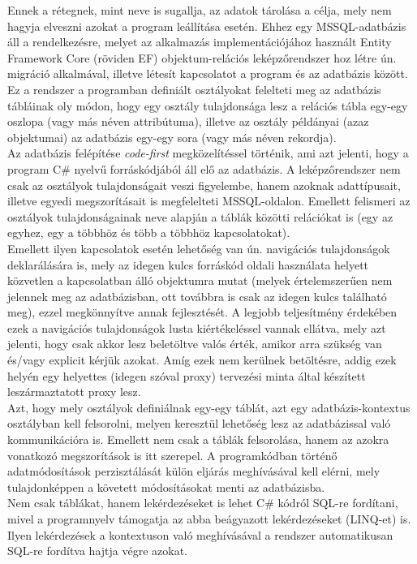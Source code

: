 Ennek a rétegnek, mint neve is sugallja, az adatok tárolása a célja, mely nem hagyja elveszni azokat a program leállítása esetén. Ehhez egy MSSQL-adatbázis áll a rendelkezésre, melyet az alkalmazás implementációjához használt Entity Framework Core (röviden EF) objektum-relációs leképzőrendszer hoz létre ún. migráció alkalmával, illetve létesít kapcsolatot a program és az adatbázis között. Ez a rendszer a programban definiált osztályokat felelteti meg az adatbázis tábláinak oly módon, hogy egy osztály tulajdonsága lesz a relációs tábla egy-egy oszlopa (vagy más néven attribútuma), illetve az osztály példányai (azaz objektumai) az adatbázis egy-egy sora (vagy más néven rekordja).\\
Az adatbázis felépítése \textit{code-first} megközelítéssel történik, ami azt jelenti, hogy a program C\# nyelvű forráskódjából áll elő az adatbázis. A leképzőrendszer nem csak az osztályok tulajdonságait veszi figyelembe, hanem azoknak adattípusait, illetve egyedi megszorításait is megfelelteti MSSQL-oldalon. Emellett felismeri az osztályok tulajdonságainak neve alapján a táblák közötti relációkat is (egy az egyhez, egy a többhöz és több a többhöz kapcsolatokat).\\
Emellett ilyen kapcsolatok esetén lehetőség van ún. navigációs tulajdonságok deklarálására is, mely az idegen kulcs forráskód oldali használata helyett közvetlen a kapcsolatban álló objektumra mutat (melyek értelemszerűen nem jelennek meg az adatbázisban, ott továbbra is csak az idegen kulcs található meg), ezzel megkönnyítve annak fejlesztését. A legjobb teljesítmény érdekében ezek a navigációs tulajdonságok lusta kiértékeléssel vannak ellátva, mely azt jelenti, hogy csak akkor lesz beletöltve valós érték, amikor arra szükség van és/vagy explicit kérjük azokat. Amíg ezek nem kerülnek betöltésre, addig ezek helyén egy helyettes (idegen szóval proxy) tervezési minta által készített leszármaztatott proxy lesz.\\
Azt, hogy mely osztályok definiálnak egy-egy táblát, azt egy adatbázis-kontextus osztályban kell felsorolni, melyen keresztül lehetőség lesz az adatbázissal való kommunikációra is. Emellett nem csak a táblák felsorolása, hanem az azokra vonatkozó megszorítások is itt szerepel. A programkódban történő adatmódosítások perzisztálását külön eljárás meghívásával kell elérni, mely tulajdonképpen a követett módosításokat menti az adatbázisba.\\
Nem csak táblákat, hanem lekérdezéseket is lehet C\# kódról SQL-re fordítani, mivel a programnyelv támogatja az abba beágyazott lekérdezéseket (LINQ-et) is. Ilyen lekérdezések a kontextuson való meghívásával a rendszer automatikusan SQL-re fordítva hajtja végre azokat.

